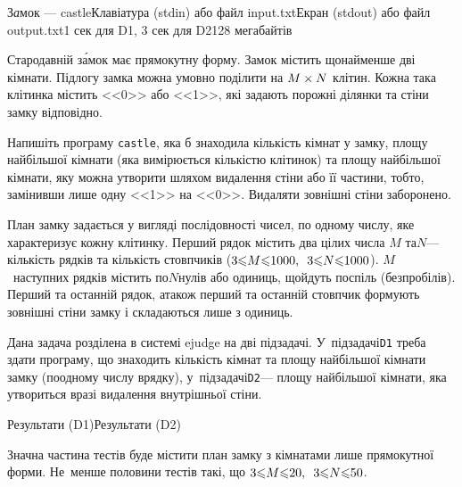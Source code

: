 \vspace{10mm}\par
\begin{problem}{З\emph{а}мок --- castle}{Клавіатура (stdin) або файл input.txt}{Екран (stdout) або файл output.txt}{1 сек для D1, 3 сек для D2}{128 мегабайтів}


Стародавній з\'{а}мок має прямокутну форму. Замок містить щонайменше дві кімнати. Підлогу замка можна умовно поділити на $M\times N$ клітин. Кожна така клітинка містить <<0>> або <<1>>, які задають порожні ділянки та стіни замку відповідно.

\Task Напишіть програму \texttt{castle}, яка б знаходила кількість кімнат у зам\-ку, площу найбільшої кімнати (яка вимірюється кількістю клітинок) та площу найбільшої кімнати, яку можна утворити шляхом видалення стіни або її частини, тобто, замінивши лише одну <<1>> на <<0>>. Видаляти зовнішні стіни заборонено.

\InputFile План замку задається у вигляді послідовності чисел, по одному числу, яке характеризує кожну клітинку. Перший рядок містить два цілих числа $M$ та\nolinebreak[2] $N$\nolinebreak[3] --- кількість рядків та кількість стовпчиків (${3{\<}M{\<}1000},\hspace{0.5em plus 1em}{3{\<}N{\<}1000}$). $M$~наступних рядків містить по\nolinebreak[3] $N$\nolinebreak[3] нулів або одиниць, що\nolinebreak[3] йдуть поспіль (без\nolinebreak[2] пробілів). Перший та останній рядок, а\nolinebreak[3] також перший та останній стовпчик формують зовнішні стіни замку і складаються лише з одиниць.

\OutputFile Дана задача розділена в системі ejudge на дві підзадачі. У~підзадачі\nolinebreak[3] \texttt{D1} треба здати програму, що знаходить кількість кімнат та площу найбільшої кімнати замку (по\nolinebreak[3] одному числу в\nolinebreak[3] рядку), у~підзадачі\nolinebreak[2] \texttt{D2}\nolinebreak[3] --- площу найбільшої кімнати, яка утвориться в\nolinebreak[3] разі видалення внутрішньої стіни.

\Examples\nopagebreak

\begin{exampleSimpleThreeWithSpecNameColTwo}{7em}{3em}{3em}{Результати (D1)}{Результати (D2)}%
%
%
\end{exampleSimpleThreeWithSpecNameColTwo}

\Scoring Значна частина тестів буде містити план замку з кімнатами лише прямокутної форми. Не~менше половини тестів такі, що ${3{\<}M{\<}20},\hspace{0.5em plus 1em}{3{\<}N{\<}50}$.

\end{problem}
